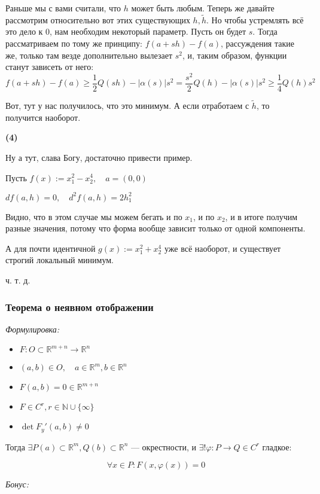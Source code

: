 \documentclass{article}
\begin{document}
Раньше мы с вами считали, что $h$ может быть любым. Теперь же давайте рассмотрим относительно вот этих существующих $h, \widetilde{h}$. Но чтобы устремлять всё это дело к 0, нам необходим некоторый параметр. Пусть он будет $s$.
Тогда рассматриваем по тому же принципу: $f(a + sh) - f(a)$, рассуждения такие же, только там везде дополнительно вылезает $s^2$, и, таким образом, функции станут зависеть от него:
\[f(a + sh) - f(a) \ge \frac{1}{2}Q(sh) - |\alpha(s)|s^2 = \frac{s^2}{2}Q(h) - |\alpha(s)|s^2 \ge \frac{1}{4}Q(h)s^2\]

Вот, тут у нас получилось, что это минимум. А если отработаем с $\widetilde{h}$, то получится наоборот.

\textbf{(4)}

Ну а тут, слава Богу, достаточно привести пример.

Пусть $f(x) := x_1^2-x_2^4, \quad a = (0, 0)$

$df(a, h) = 0, \quad  d^2f(a,h) = 2h_1^2$

Видно, что в этом случае мы можем бегать и по $x_1$, и по $x_2$, и в итоге получим разные значения, потому что форма вообще зависит только от одной компоненты.

А для почти идентичной $g(x) := x_1^2 + x_2^4$ уже всё наоборот, и существует строгий локальный минимум.

ч. т. д. 

\subsubsection{Теорема о неявном отображении}
\textit{Формулировка:}

\begin{itemize}
    \item $F: O \subset \mathbb{R}^{m + n} \rightarrow \mathbb{R}^n$
    \item $(a, b) \in O, \quad a \in \mathbb{R}^m, b \in \mathbb{R}^n$
    \item $F(a, b) = 0 \in \mathbb{R}^{m + n}$
    \item $F \in C^r, r \in \mathbb{N} \cup \{\infty\}$
    \item $\det F_y'(a, b) \neq 0$
\end{itemize}

Тогда $\exists P(a) \subset \mathbb{R}^m, Q(b) \subset \mathbb{R}^n$ --- окрестности, и $\exists !\varphi : P \rightarrow Q \in C^r$ гладкое:

\[\forall x \in P: F(x, \varphi(x)) = 0\]

\textit{Бонус:}
\end{document}
